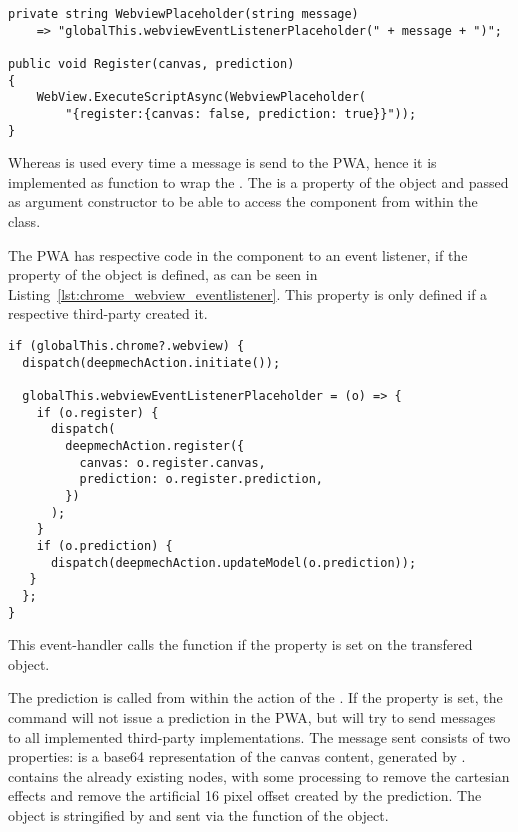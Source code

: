\begin{lstlisting}[label={lst:deepmech_webview_register}, caption={DeepmechWebView Register function}]
private string WebviewPlaceholder(string message)
    => "globalThis.webviewEventListenerPlaceholder(" + message + ")";

public void Register(canvas, prediction)
{
    WebView.ExecuteScriptAsync(WebviewPlaceholder(
        "{register:{canvas: false, prediction: true}}"));
}
\end{lstlisting}

Whereas  is used every time a message is send to the PWA, hence it is implemented as function to wrap the .
The  is a property of the  object and passed as argument constructor to be able to access the  component from within the class.

The PWA has respective code in the  component to an event listener, if the  property of the  object is defined, as can be seen in Listing~\ref{lst:chrome_webview_eventlistener}.
This  property is only defined if a respective third-party created it.

\begin{lstlisting}[label={lst:chrome_webview_eventlistener}, caption={PWA event-handler for the chrome webview}]
if (globalThis.chrome?.webview) {
  dispatch(deepmechAction.initiate());

  globalThis.webviewEventListenerPlaceholder = (o) => {
    if (o.register) {
      dispatch(
        deepmechAction.register({
          canvas: o.register.canvas,
          prediction: o.register.prediction,
        })
      );
    }
    if (o.prediction) {
      dispatch(deepmechAction.updateModel(o.prediction));
   }
  };
}
\end{lstlisting}

This event-handler calls the  function if the  property is set on the transfered object.

The prediction is called from within the  action of the .
If the  property is set, the  command will not issue a prediction in the PWA, but will try to send messages to all implemented third-party implementations.
The message sent consists of two properties:
 is a base64 representation of the canvas content, generated by .
 contains the already existing nodes, with some processing to remove the cartesian effects and remove the artificial 16 pixel offset created by the prediction.
The object is stringified by  and sent via the  function of the  object.

